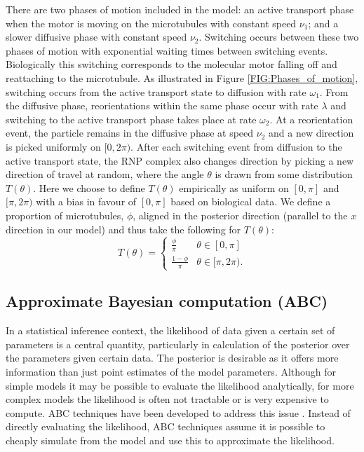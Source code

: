 \documentclass[twocolumn]{biophys}
\begin{document}
There are two phases of motion included in the model: an active transport phase when the motor is moving on the microtubules with constant speed $\nu_1$; and a slower diffusive phase with constant speed $\nu_2$.
Switching occurs between these two phases of motion with exponential waiting times between switching events.
Biologically this switching corresponds to the molecular motor falling off and reattaching to the microtubule.
As illustrated in Figure \ref{FIG:Phases_of_motion}, switching occurs from the active transport state to diffusion with rate $\omega_1$. 
From the diffusive phase, reorientations within the same phase occur with rate $\lambda$ and switching to the active transport phase takes place at rate $\omega_2$. 
At a reorientation event, the particle remains in the diffusive phase at speed $\nu_2$ and a new direction is picked uniformly on $[0,2\pi)$.
After each switching event from diffusion to the active transport state, the RNP complex also changes direction by picking a new direction of travel at random, where the angle $\theta $ is drawn from some distribution $T(\theta)$. 
Here we choose to define $T(\theta)$ empirically as uniform on $[0,\pi ]$ and $[\pi, 2\pi )$ with a bias in favour of $[0,\pi ]$ based on biological data.
We define a proportion of microtubules, $\phi$, aligned in the posterior direction (parallel to the $x$ direction in our model) and thus take the following for $T(\theta)$:
\begin{equation*}         
T(\theta) = \begin{cases} \frac{\phi}{\pi} &  \theta \in [0,\pi] \\ \frac{1-\phi}{\pi} &  \theta \in [\pi,2\pi).                       
\end{cases}
\end{equation*}

\subsection{Approximate Bayesian computation (ABC)}
In a statistical inference context, the likelihood of data given a certain set of parameters is a central quantity, particularly in calculation of the posterior over the parameters given certain data. 
The posterior is desirable as it offers more information than just point estimates of the model parameters.
Although for simple models it may be possible to evaluate the likelihood analytically, for more complex models the likelihood is often not tractable or is very expensive to compute.  
ABC techniques have been developed to address this issue \cite{beaumont2002approximate}.
Instead of directly evaluating the likelihood, ABC techniques assume it is possible to cheaply simulate from the model and use this to approximate the likelihood.
\end{document}
